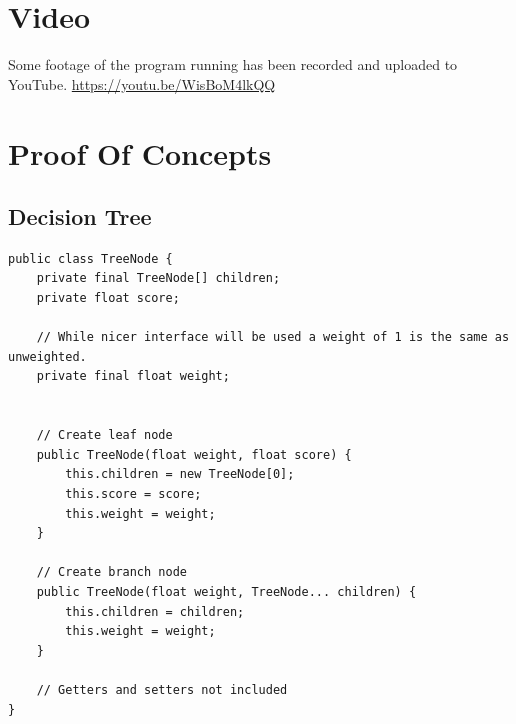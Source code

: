 \documentclass{article}
\begin{document}
\section{Video}
\label{subsec:vid}
\par{Some footage of the program running has been recorded and uploaded to YouTube.}
\href{https://youtu.be/WisBoM4lkQQ}{https://youtu.be/WisBoM4lkQQ}
\section{Proof Of Concepts}
\subsection{Decision Tree}
\label{subsubsec:apendixdt}
\begin{verbatim}
public class TreeNode {
    private final TreeNode[] children;
    private float score;

    // While nicer interface will be used a weight of 1 is the same as unweighted.
    private final float weight;


    // Create leaf node
    public TreeNode(float weight, float score) {
        this.children = new TreeNode[0];
        this.score = score;
        this.weight = weight;
    }

    // Create branch node
    public TreeNode(float weight, TreeNode... children) {
        this.children = children;
        this.weight = weight;
    }

    // Getters and setters not included
}
\end{verbatim}
\end{document}
